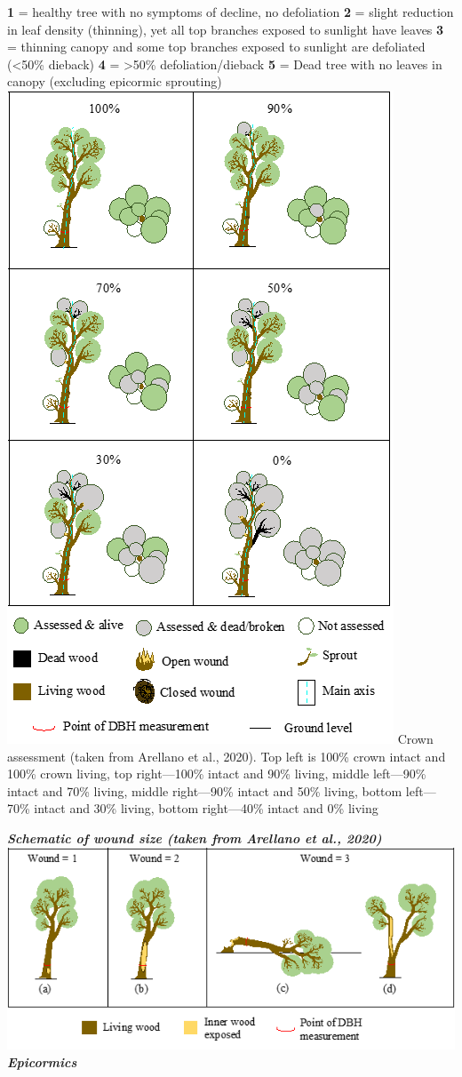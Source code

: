 \documentclass[
]{article}
\begin{document}
\textbf{1} = healthy tree with no symptoms of decline, no defoliation
\textbf{2} = slight reduction in leaf density (thinning), yet all top
branches exposed to sunlight have leaves \textbf{3} = thinning canopy
and some top branches exposed to sunlight are defoliated (\textless50\%
dieback) \textbf{4} = \textgreater50\% defoliation/dieback \textbf{5} =
Dead tree with no leaves in canopy (excluding epicormic sprouting)
\includegraphics{figures_tables/Crown_assessment.png} Crown assessment
(taken from Arellano et al., 2020). Top left is 100\% crown intact and
100\% crown living, top right---100\% intact and 90\% living, middle
left---90\% intact and 70\% living, middle right---90\% intact and 50\%
living, bottom left---70\% intact and 30\% living, bottom right---40\%
intact and 0\% living

\textbf{\emph{Schematic of wound size (taken from Arellano et al.,
2020)}} \includegraphics{figures_tables/Woundsize.png} \newpage
\textbf{\emph{Epicormics}}
\end{document}
